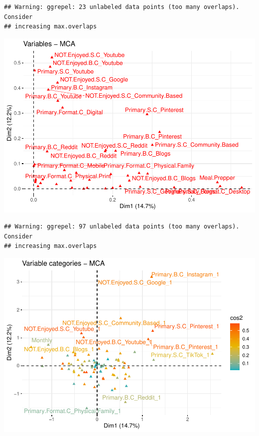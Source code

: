 \documentclass[
]{article}
\newenvironment{Shaded}{\begin{snugshade}}{\end{snugshade}}
\newcommand{\DataTypeTok}[1]{\textcolor[rgb]{0.13,0.29,0.53}{#1}}
\newcommand{\KeywordTok}[1]{\textcolor[rgb]{0.13,0.29,0.53}{\textbf{#1}}}
\newcommand{\NormalTok}[1]{#1}
\newcommand{\OtherTok}[1]{\textcolor[rgb]{0.56,0.35,0.01}{#1}}
\newcommand{\StringTok}[1]{\textcolor[rgb]{0.31,0.60,0.02}{#1}}
\begin{document}
\begin{verbatim}
## Warning: ggrepel: 23 unlabeled data points (too many overlaps). Consider
## increasing max.overlaps
\end{verbatim}

\includegraphics{Average-User-MCA_files/figure-latex/diet yes not enjoy-2.pdf}

\begin{Shaded}
\end{Shaded}

\begin{verbatim}
## Warning: ggrepel: 97 unlabeled data points (too many overlaps). Consider
## increasing max.overlaps
\end{verbatim}

\includegraphics{Average-User-MCA_files/figure-latex/diet yes not enjoy-3.pdf}
\end{document}
